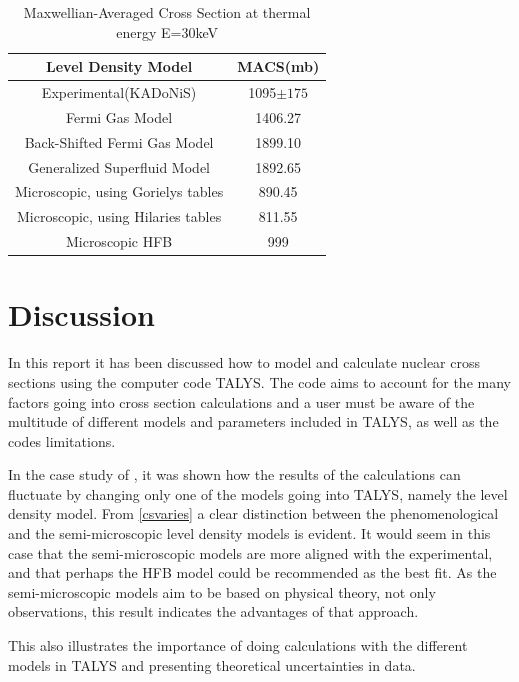 \documentclass[a4paper,english]{article}
\begin{document}
\begin{table}[H]
  \centering
  \renewcommand{\arraystretch}{1.25}
    \begin{tabular}{ c c }
    \hline
    Level Density Model & MACS(mb) \\ 
    \hline
    Experimental(KADoNiS)\cite{kadonis} & 1095$\pm{175}$ \\
	Fermi Gas Model & 1406.27\\
	Back-Shifted Fermi Gas Model & 1899.10 \\
	Generalized Superfluid Model & 1892.65 \\
	Microscopic, using Gorielys tables & 890.45 \\
	Microscopic, using Hilaries tables & 811.55 \\
	Microscopic HFB & 999 \\
	\hline
    \end{tabular}
  \caption{Maxwellian-Averaged Cross Section at thermal energy E=30keV}
  \label{csvaries}
\end{table}
\section{Discussion}
In this report it has been discussed how to model and calculate nuclear cross sections using the computer code TALYS. The code aims to account for the many factors going into cross section calculations and a user must be aware of the multitude of different models and parameters included in TALYS, as well as the codes limitations.

In the case study of , it was shown how the results of the calculations can fluctuate by changing only one of the models going into TALYS, namely the level density model. From \autoref{csvaries} a clear distinction between the phenomenological and the semi-microscopic level density models is evident. It would seem in this case that the semi-microscopic models are more aligned with the experimental, and that perhaps the HFB model could be recommended as the best fit. As the semi-microscopic models aim to be based on physical theory, not only observations, this result indicates the advantages of that approach. 

This also illustrates the importance of doing calculations with the different models in TALYS and presenting theoretical uncertainties in data.

\end{document}
